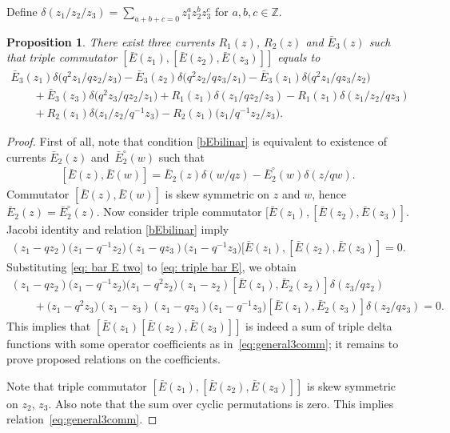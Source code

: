 \documentclass[pdftex]{sigma}
\numberwithin{equation}{section}
\newtheorem{Proposition}[Theorem]{Proposition}
\theoremstyle{definition}
\newcommand{\bE}{\bar{E}}
\begin{document}
Define $\delta(z_1/z_2/z_3)= \sum\limits_{a+b+c=0} z_1^a z_2^b z_3^c$ for $a,b,c \in \mathbb{Z}$.
\begin{Proposition} \label{Prop:withoutSerre} There exist three currents $R_1(z)$, $R_2(z)$ and $\bE_3(z)$ such that triple commutator $[ \bE(z_1) , [ \bE(z_2), \bE(z_3) ]]$ equals to
\begin{gather}
\bE_3(z_1) \delta\big(q^2 z_1/q z_2 /z_3\big) - \bE_3(z_2) \delta\big(q^2 z_2/ qz_3/z_1 \big) - \bE_3 (z_1) \delta\big(q^2z_1/ qz_3 / z_2\big)\nonumber\\
\qquad{} + \bE_3 (z_3) \delta\big(q^2z_3/qz_2/z_1\big)+ R_1(z_1) \delta(z_1/ qz_2/ z_3) - R_1(z_1) \delta(z_1/ z_2/ qz_3)\nonumber\\
\qquad{} + R_2(z_1) \delta\big(z_1/z_2/q^{-1}z_3\big) - R_2(z_1) \big(z_1/q^{-1}z_2/z_3\big).\label{eq:general3comm}
\end{gather}
\end{Proposition}

\begin{proof}
First of all, note that condition \eqref{bEbilinar} is equivalent to existence of currents $\bE_2(z)$ and~$\bE^{\circ}_2(w)$ such that
\begin{gather} \label{eq: bar E two}
[\bE(z), \bE(w)] = \bE_2(z) \delta(w/qz) - \bE^{\circ}_2(w) \delta(z/qw).
\end{gather}
Commutator $[\bE(z), \bE(w)]$ is skew symmetric on $z$ and $w$, hence $\bE_2(z) = \bE^{\circ}_2(z)$.
Now consider triple commutator $[ \bE(z_1) , [ \bE(z_2), \bE(z_3) ]$. Jacobi identity and relation \eqref{bEbilinar} imply \begin{gather} \label{eq: triple bar E}
(z_1 -qz_2)\big(z_1-q^{-1}z_2\big)(z_1-qz_3)\big(z_1-q^{-1}z_3\big) [ \bE(z_1) , [ \bE(z_2), \bE(z_3) ] = 0.
\end{gather}
Substituting \eqref{eq: bar E two} to \eqref{eq: triple bar E}, we obtain
\begin{gather*}
(z_1 -qz_2)\big(z_1-q^{-1}z_2\big)\big(z_1-q^2 z_2\big)(z_1-z_2) [ \bE(z_1) , \bar{E}_2(z_2) ] \delta(z_3/qz_2) \\
\qquad{}+\big(z_1 -q^2 z_3\big)(z_1-z_3)(z_1-q z_3)\big(z_1-q^{-1} z_3\big) [ \bE(z_1) , \bar{E}_2(z_3) ] \delta(z_2/qz_3)= 0.
\end{gather*}
This implies that $ [ \bE(z_1) [\bE(z_2), \bE(z_3)]]$ is indeed a sum of triple delta functions with some operator coefficients as in~\eqref{eq:general3comm}; it remains to prove proposed relations on the coefficients.

Note that triple commutator $ [ \bE(z_1) , [ \bE(z_2), \bE(z_3)] ]$ is skew symmetric on $z_2$, $z_3$. Also note that the sum over cyclic permutations is zero. This implies relation~\eqref{eq:general3comm}.
\end{proof}
\end{document}
